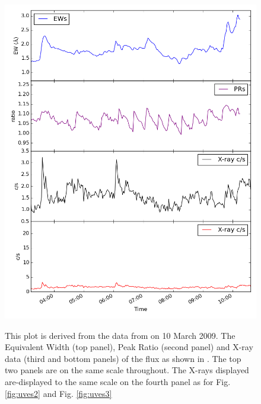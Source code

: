 \begin{figure}[!htbp]
\centering
\includegraphics[scale=0.30]{Figures/uves1.png} \\
\caption{This plot is derived from the data from {\uves} on 10 March 2009.
  The Equivalent Width (top panel), Peak Ratio (second panel) and X-ray data (third and bottom panels) of the
  {\ha} flux as shown in \citet[Fig. 1]{fuhrmeister11}. The top two panels are on the same scale
  throughout. The X-rays displayed are-displayed to the same scale on the fourth panel as for Fig. \ref{fig:uves2} and
  Fig. \ref{fig:uves3}}
 \protect\label{fig:uves1}
\end{figure}
